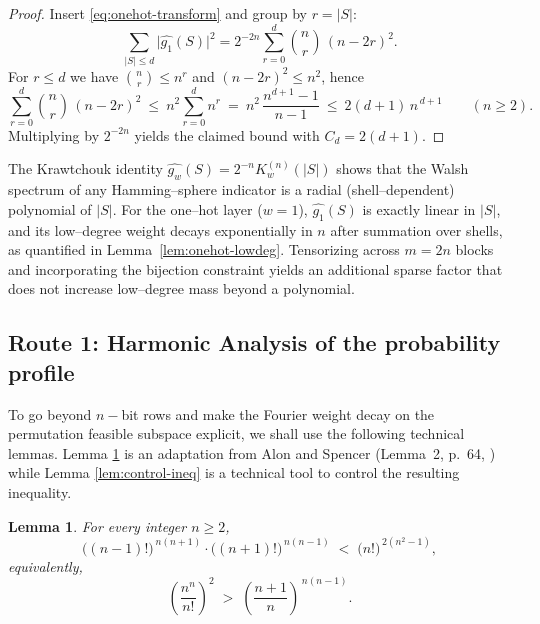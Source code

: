 \documentclass[a4paper,onecolumn,11pt,unpublished]{quantumarticle}
\newtheorem{lemma}[theorem]{Lemma}
\theoremstyle{remark}
\begin{document}
\begin{proof}
Insert \eqref{eq:onehot-transform} and group by $r=|S|$:
\[
  \sum_{|S|\le d}\! \bigl|\widehat{g_1}(S)\bigr|^2
  = 2^{-2n}\sum_{r=0}^{d} \binom{n}{r}\,(n-2r)^2.
\]
For $r\le d$ we have $\binom{n}{r}\le n^{r}$ and $(n-2r)^2\le n^{2}$, hence
\[
  \sum_{r=0}^{d} \binom{n}{r}\,(n-2r)^2
  \ \le\ n^{2}\sum_{r=0}^{d} n^{r}
  \ =\ n^{2}\,\frac{n^{d+1}-1}{n-1}
  \ \le\ 2(d+1)\,n^{\,d+1}\qquad(n\ge 2).
\]
Multiplying by $2^{-2n}$ yields the claimed bound with $C_d=2(d+1)$.
\end{proof}


The Krawtchouk identity $\widehat{g_w}(S)=2^{-n}K_w^{(n)}(|S|)$ shows that the Walsh spectrum
of any Hamming–sphere indicator is a radial (shell–dependent) polynomial of $|S|$.
For the one–hot layer ($w=1$), $\widehat{g_1}(S)$ is exactly linear in $|S|$,
and its low–degree weight decays exponentially in $n$ after summation over shells, as quantified in Lemma~\ref{lem:onehot-lowdeg}. Tensorizing across $m=2n$ blocks and incorporating the bijection constraint yields an additional sparse factor that does not increase low–degree mass beyond a polynomial.


\subsection{Route 1: Harmonic Analysis of the probability profile}
\label{sec:route1}

To go beyond $n-$bit rows and make the Fourier weight decay on the permutation feasible subspace explicit, we shall use the following technical lemmas. Lemma \ref{lem:ratio-nn-over-nfact} is an adaptation from  Alon and Spencer (Lemma~2, p.~64, \cite{AlonSpencer2008}) while Lemma \ref{lem:control-ineq} is a technical tool to control the resulting inequality.

\begin{lemma}
\label{lem:ratio-nn-over-nfact}
For every integer $n\ge 2$,
\[
\bigl((n-1)!\bigr)^{\,n(n+1)}\cdot \bigl((n+1)!\bigr)^{\,n(n-1)}
\;<\;
\bigl(n!\bigr)^{\,2(n^2-1)},
\]
equivalently,
\[
\left(\frac{n^n}{n!}\right)^{\!2}
\;>\;
\left(\frac{n+1}{n}\right)^{\,n(n-1)}.
\]
\end{lemma}
\end{document}
